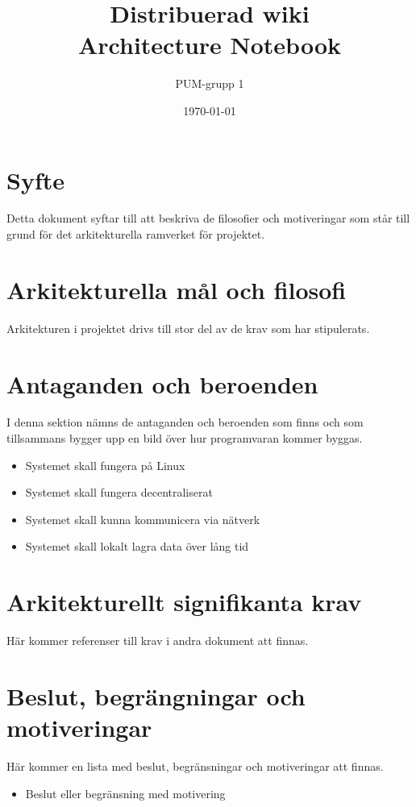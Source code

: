 

\ifpdf
\else
\fi

\title{Distribuerad wiki \\ Architecture Notebook}
\author{PUM-grupp 1}
\date{\today}



\maketitle

\thispagestyle{empty}
\newpage
\section{Syfte}
Detta dokument syftar till att beskriva de filosofier och motiveringar som står till grund för det arkitekturella ramverket för projektet.
\section{Arkitekturella mål och filosofi}
Arkitekturen i projektet drivs till stor del av de krav som har stipulerats.
\section{Antaganden och beroenden}
I denna sektion nämns de antaganden och beroenden som finns och som tillsammans bygger upp en bild över hur programvaran kommer byggas.
\begin{itemize}
\item Systemet skall fungera på Linux
\item Systemet skall fungera decentraliserat
\item Systemet skall kunna kommunicera via nätverk
\item Systemet skall lokalt lagra data över lång tid
\end{itemize}
\section{Arkitekturellt signifikanta krav}
Här kommer referenser till krav i andra dokument att finnas.
\section{Beslut, begrängningar och motiveringar}
Här kommer en lista med beslut, begränsningar och motiveringar att finnas.
\begin{itemize}
\item Beslut eller begränsning med motivering
\end{itemize}
